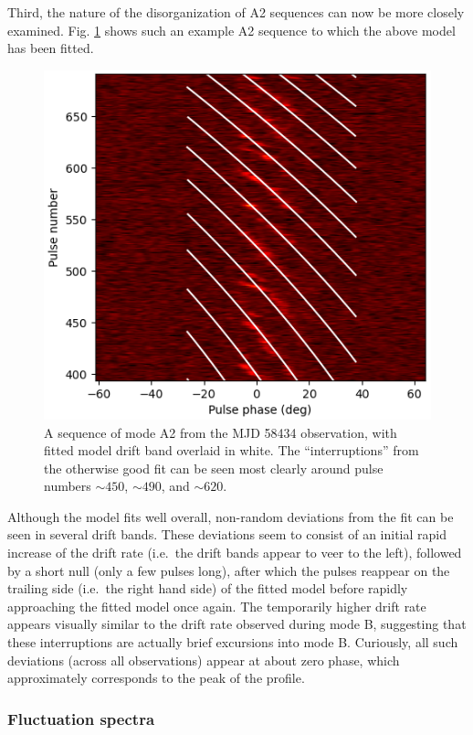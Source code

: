 \documentclass[linenumbers]{aastex631}
\begin{document}
Third, the nature of the disorganization of A2 sequences can now be more closely examined.
Fig. \ref{fig:A2_example} shows such an example A2 sequence to which the above model has been fitted.
\begin{figure}[!th]
    \centering
    \includegraphics[width=\linewidth]{1226062160_A2_example.png}
    \caption{A sequence of mode A2 from the MJD 58434 observation, with fitted model drift band overlaid in white. The ``interruptions'' from the otherwise good fit can be seen most clearly around pulse numbers $\sim450$, $\sim490$, and $\sim620$.}
    \label{fig:A2_example}
\end{figure}
Although the model fits well overall, non-random deviations from the fit can be seen in several drift bands.
These deviations seem to consist of an initial rapid increase of the drift rate (i.e.\ the drift bands appear to veer to the left), followed by a short null (only a few pulses long), after which the pulses reappear on the trailing side (i.e.\ the right hand side) of the fitted model before rapidly approaching the fitted model once again.
The temporarily higher drift rate appears visually similar to the drift rate observed during mode B, suggesting that these interruptions are actually brief excursions into mode B.
Curiously, all such deviations (across all observations) appear at about zero phase, which approximately corresponds to the peak of the profile.


\subsubsection{Fluctuation spectra}
\end{document}
